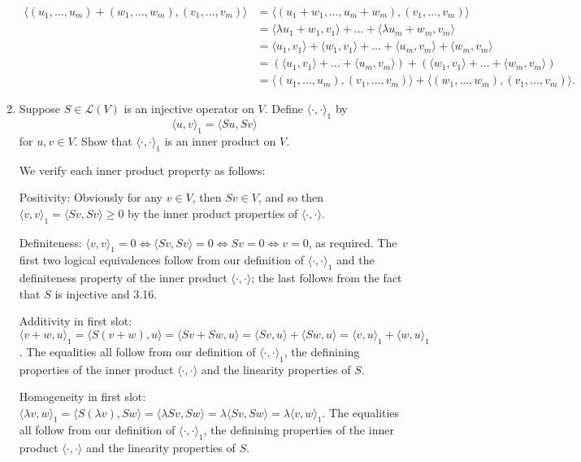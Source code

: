 \documentclass{book}
\begin{document}
\begin{enumerate}
\begin{equation*}
    \begin{split}
        \langle (u_1,\dots,u_m)+(w_1,\dots,w_m),(v_1,\dots,v_m) \rangle &= \langle (u_1+w_1,\dots,u_m+w_m), (v_1,\dots,v_m) \rangle \\
        &= \langle \lambda u_1+w_1,v_1 \rangle + \dots + \langle \lambda u_m+w_m,v_m \rangle \\
        &= \langle u_1,v_1 \rangle + \langle w_1,v_1 \rangle + \dots + \langle u_m,v_m \rangle + \langle w_m,v_m \rangle \\
        &= (\langle u_1,v_1 \rangle + \dots + \langle u_m,v_m \rangle) + (\langle w_1,v_1 \rangle + \dots + \langle w_m,v_m \rangle) \\
        &= \langle (u_1,\dots,u_m),(v_1,\dots,v_m) \rangle + \langle (w_1,\dots,w_m),(v_1,\dots,v_m) \rangle.
    \end{split}
\end{equation*}

\item Suppose \(S \in \mathcal{L}(V)\) is an injective operator on \(V\).  Define \(\langle \cdot,\cdot \rangle_1\) by \[\langle u,v \rangle_1 = \langle Su,Sv \rangle\] for \(u,v \in V\).  Show that \(\langle \cdot,\cdot \rangle_1\) is an inner product on \(V\).

We verify each inner product property as follows:

Positivity: Obviously for any \(v \in V\), then \(Sv \in V\), and so then \(\langle v,v \rangle_1 = \langle Sv,Sv \rangle \geq 0\) by the inner product properties of \(\langle \cdot,\cdot \rangle\).

Definiteness: \(\langle v,v \rangle_1 = 0 \Leftrightarrow \langle Sv,Sv \rangle = 0 \Leftrightarrow Sv = 0 \Leftrightarrow v = 0\), as required.  The first two logical equivalences follow from our definition of \(\langle \cdot,\cdot \rangle_1\) and the definiteness property of the inner product \(\langle \cdot,\cdot \rangle\); the last follows from the fact that \(S\) is injective and 3.16.

Additivity in first slot: \(\langle v+w,u \rangle_1 = \langle S(v+w),u \rangle = \langle Sv+Sw,u \rangle = \langle Sv,u \rangle + \langle Sw,u \rangle = \langle v,u \rangle_1 + \langle w,u \rangle_1\).  The equalities all follow from our definition of \(\langle \cdot,\cdot \rangle_1\), the definining properties of the inner product \(\langle \cdot,\cdot \rangle\) and the linearity properties of \(S\).

Homogeneity in first slot: \(\langle \lambda v,w \rangle_1 = \langle S(\lambda v),Sw \rangle = \langle \lambda Sv,Sw \rangle = \lambda \langle Sv,Sw \rangle = \lambda \langle v,w \rangle_1\).  The equalities all follow from our definition of \(\langle \cdot,\cdot \rangle_1\), the definining properties of the inner product \(\langle \cdot,\cdot \rangle\) and the linearity properties of \(S\).


\end{enumerate}
\end{document}

